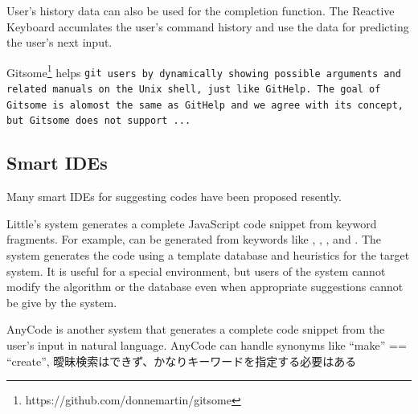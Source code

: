 \documentclass{sigchi}
\def\GH{\textsf{GitHelp}}
\begin{document}
User's history data can also be used for the completion function.
The Reactive Keyboard\cite{ReactiveKeyboard}
accumlates the user's command history and use the data
for predicting the user's next input.


Gitsome\footnote{\textsf{https:{\slash}{\slash}github.com{\slash}donnemartin{\slash}gitsome}}
helps \tt{git} users by
dynamically showing possible arguments and related manuals on the Unix shell,
just like {\GH}.
The goal of Gitsome is alomost the same as {\GH} and we agree with its concept,
but Gitsome does not support ...

\subsection{Smart IDEs}

Many smart IDEs for suggesting codes have been proposed resently.

Little's system\cite{Little:2006:TKC:1166253.1166275}
generates a complete JavaScript code snippet from keyword fragments.
For example,
can be generated from keywords like
,
,
, and
.
The system generates the code using a template database and heuristics
for the target system.
It is useful for a special environment, but
users of the system cannot modify the algorithm or the database
even when appropriate suggestions cannot be give by the system.


AnyCode\cite{Gvero:2015:SJE:2814270.2814295} is another system
that generates a complete code snippet from the user's
input in natural language.
AnyCode can handle synonyms like ``make'' == ``create'',
曖昧検索はできず、かなりキーワードを指定する必要はある

\end{document}
